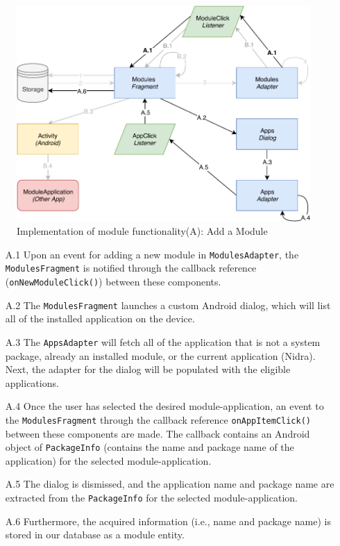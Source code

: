\begin{figure}
    \centering
    \includegraphics[scale=0.7]{images/Module_ImpA.pdf}
    \caption{Implementation of module functionality(A): Add a Module}
    \label{fig:impl_modulesA}
\end{figure}

\begin{itemize}
    \item[A.1] Upon an event for adding a new module in \verb|ModulesAdapter|, the \verb|ModulesFragment| is notified through the callback reference (\verb|onNewModuleClick()|) between these components.
    \item[A.2] The \verb|ModulesFragment| launches a custom Android dialog, which will list all of the installed application on the device. 
    \item[A.3] The \verb|AppsAdapter| will fetch all of the application that is not a system package, already an installed module, or the current application (Nidra). Next, the adapter for the dialog will be populated with the eligible applications. 
    \item[A.4] Once the user has selected the desired module-application, an event to the \verb|ModulesFragment| through the callback reference \verb|onAppItemClick()| between these components are made. The callback contains an Android object of \verb|PackageInfo| (contains the name and package name of the application) for the selected module-application.
    \item[A.5] The dialog is dismissed, and the application name and package name are extracted from the \verb|PackageInfo| for the selected module-application. 
    \item[A.6] Furthermore, the acquired information (i.e., name and package name) is stored in our database as a module entity. 
\end{itemize}

